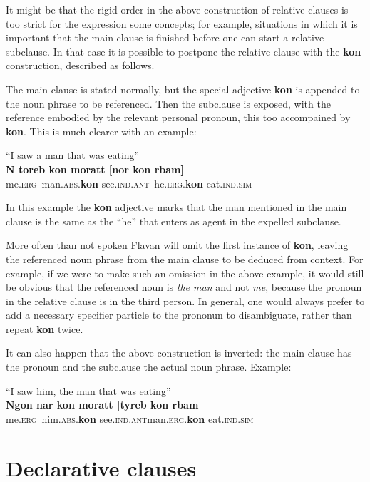 \documentclass[10pt,oneside]{memoir}
\newcommand{\grammar}[1]{\textsc{#1}}
\newcommand{\ERG}{\grammar{erg}}
\newcommand{\ABS}{\grammar{abs}}
\newcommand{\SIM}{\grammar{sim}}
\newcommand{\ANT}{\grammar{ant}}
\newcommand{\IND}{\grammar{ind}}
\begin{document}
It might be that the rigid order in the above construction of relative clauses is too strict for the expression some concepts; for example, situations in which it is important that the main clause is finished before one can start a relative subclause. In that case it is possible to postpone the relative clause with the \textbf{kon} construction, described as follows.

The main clause is stated normally, but the special adjective \textbf{kon} is appended to the noun phrase to be referenced. Then the subclause is exposed, with the reference embodied by the relevant personal pronoun, this too accompained by \textbf{kon}. This is much clearer with an example:

\begin{center}
    ``I saw a man that was eating''\\
    \textbf{N toreb kon moratt [nor kon rbam]}\\
    me.\ERG\ man.\ABS.\textbf{kon} see.\IND.\ANT\ he.\ERG.\textbf{kon} eat.\IND.\SIM
\end{center}

In this example the \textbf{kon} adjective marks that the man mentioned in the main clause is the same as the ``he'' that enters as agent in the expelled subclause.

More often than not spoken Flavan will omit the first instance of \textbf{kon}, leaving the referenced noun phrase from the main clause to be deduced from context. For example, if we were to make such an omission in the above example, it would still be obvious that the referenced noun is \emph{the man} and not \emph{me}, because the pronoun in the relative clause is in the third person. In general, one would always prefer to add a necessary specifier particle to the prononun to disambiguate, rather than repeat \textbf{kon} twice.

It can also happen that the above construction is inverted: the main clause has the pronoun and the subclause the actual noun phrase. Example:

\begin{center}
    ``I saw him, the man that was eating''\\
    \textbf{Ngon nar kon moratt [tyreb kon rbam]}\\
    me.\ERG\ him.\ABS.\textbf{kon} see.\IND.\ANT man.\ERG.\textbf{kon} eat.\IND.\SIM
\end{center}

\section{Declarative clauses}
\end{document}
